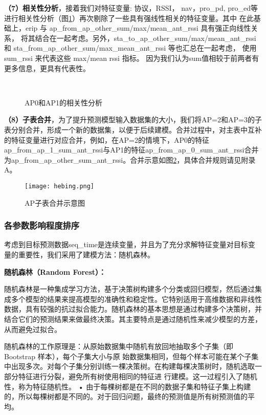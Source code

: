 \documentclass[bwprint]{gmcmthesis}
\begin{document}
\textbf{（7）相关性分析}，接着我们对特征变量: 协议，RSSI， nav，pro\_pd, pro\_ed等进行相关性分析（图\ref{pho:corr}）再次剔除了一些具有强线性相关的特征变量。其中
在此基础上，erip 与 ap\_from\_ap\_other\_sum/max/mean\_ant\_rssi 具有强正向线性关系，
将其结合在一起考虑。另外，sta\_to\_ap\_other\_sum/max/mean\_ant\_rssi 和 sta\_from\_ap\_other\_sum/max\_mean\_ant\_rssi 等也汇总在一起考虑，
使用 sum\_rssi 来代表这些 max/mean rssi 指标。
因为我们认为sum值相较于前两者有更多信息，更具有代表性。

\begin{figure}[!htp]
	\centering
	\qquad
	 \\
	\qquad
	\caption{AP0和AP1的相关性分析}
    \label{pho:corr}
\end{figure}

\textbf{（8）子表合并}，为了提升预测模型输入数据集的大小，我们将AP=2和AP=3的子表分别合并，形成一个新的数据集，以便于后续建模。合并过程中，对主表中互补的特征变量进行对应合并，例如，在AP=2的情境下，AP0的特征ap\_from\_ap\_1\_sum\_ant\_rssi与AP1的特征ap\_from\_ap\_0\_sum\_ant\_rssi合并为ap\_from\_ap\_other\_sum\_ant\_rssi。合并示意如图\ref{pho:hebing}，具体合并规则请见附录A。

\begin{figure}[!htbp]
    \centering
    \texttt{[image: hebing.png]}
    \caption{\centering AP子表合并示意图}
    \label{pho:hebing}
\end{figure}
\subsubsection{各参数影响程度排序}
 考虑到目标预测数据seq\_time是连续变量，并且为了充分求解特征变量对目标变量的重要性，我们采用了建模方法：随机森林。

 \textbf{随机森林（Random Forest）：}

随机森林是一种集成学习方法，基于决策树构建多个分类或回归模型，然后通过集成多个模型的结果来提高模型的准确性和稳定性。它特别适用于高维数据和非线性数据，具有较强的抗过拟合能力。随机森林的基本思想是通过构建多个决策树，并结合它们的预测结果来做最终决策。其主要特点是通过随机性来减少模型的方差，从而避免过拟合。

随机森林的工作原理是：从原始数据集中随机有放回地抽取多个子集（即 Bootstrap 样本），每个子集大小与原
始数据集相同，但每个样本可能在某个子集中出现多次。对每个子集分别训练一棵决策树。在构建每棵决策树时，随机选取一部分特征进行分裂，避免所有树使用相同的特征进
行建模。这一过程引入了随机性，称为特征随机性。
• 由于每棵树都是在不同的数据子集和特征子集上构建的，所以每棵树都是不同的。对于回归问题，最终的预测值是所有树预测值的平均。
\end{document}
